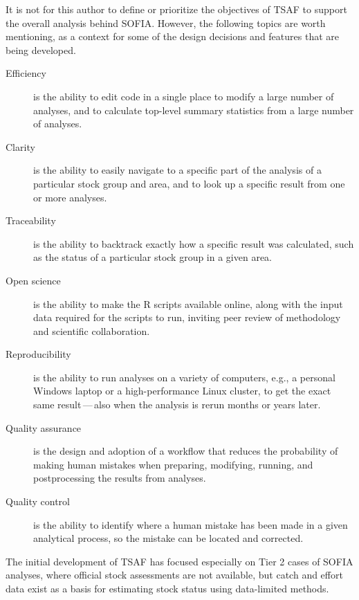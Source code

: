 \documentclass[12pt]{article}
\begin{document}
It is not for this author to define or prioritize the objectives of TSAF to
support the overall analysis behind SOFIA. However, the following topics are
worth mentioning, as a context for some of the design decisions and features
that are being developed.\\[-1.5ex]

\begin{description}
  \item[Efficiency] is the ability to edit code in a single place to modify a
  large number of analyses, and to calculate top-level summary statistics from a
  large number of analyses.\\[-2.5ex]
  \item[Clarity] is the ability to easily navigate to a specific part of the
  analysis of a particular stock group and area, and to look up a specific
  result from one or more analyses.\\[-2.5ex]
  \item[Traceability] is the ability to backtrack exactly how a specific result
  was calculated, such as the status of a particular stock group in a given
  area.\\[-2.5ex]
  \item[Open science] is the ability to make the R scripts available online,
  along with the input data required for the scripts to run, inviting peer
  review of methodology and scientific collaboration.\\[-2.5ex]
  \item[Reproducibility] is the ability to run analyses on a variety of
  computers, e.g., a personal Windows laptop or a high-performance Linux
  cluster, to get the exact same result$\,$---$\,$also when the analysis is
  rerun months or years later.\\[-2.5ex]
  \item[Quality assurance] is the design and adoption of a workflow that reduces
  the probability of making human mistakes when preparing, modifying, running,
  and postprocessing the results from analyses.\\[-2.5ex]
  \item[Quality control] is the ability to identify where a human mistake has
  been made in a given analytical process, so the mistake can be located and
  corrected.\\[-1.5ex]
\end{description}

The initial development of TSAF has focused especially on Tier 2 cases of SOFIA
analyses, where official stock assessments are not available, but catch and
effort data exist as a basis for estimating stock status using data-limited
methods.
\end{document}
